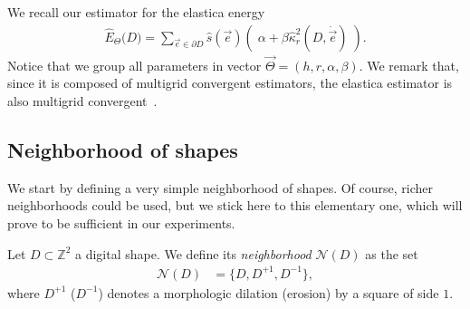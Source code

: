 \documentclass[review]{siamart220329}
\newcommand{\digset}{D} %
\begin{document}
%
%
We recall our estimator for the elastica energy 
%
\begin{align}
    \hat{E}_{\Theta}\big( \digset \big) = \sum_{\vec{e} \in \partial \digset}{
    \hat{s}(\vec{e})\left(\; \alpha + \beta
    \hat{\kappa}_{r}^2(\digset,\dot{\vec{e}}) \; \right)}.
	\label{eq:elastica-estimator-2}
\end{align}
%
%
Notice that we group all parameters in vector $\vec{\Theta}=(h,r,\alpha,\beta)$.
We remark that, since it is composed of multigrid convergent estimators, the
elastica estimator is also multigrid convergent~\cite{lachaud06hdr}.
%

%    
%
%
%
\subsection{Neighborhood of shapes}
%
%
We start by defining a very simple neighborhood of shapes. Of course, richer
neighborhoods could be used, but we stick here to this elementary one, which
will prove to be sufficient in our experiments.
%
%
\begin{definition}
    Let $\digset \subset \mathbb{Z}^2$ a digital shape. We define its {\em
    neighborhood}  $\mathcal{N}(\digset)$ as the set
	\begin{align*}
		\mathcal{N}(\digset) &= \Big\{\digset, \digset^{+1},\digset^{-1} \big\},
	\end{align*}
    where $\digset^{+1}$ ($\digset^{-1}$) denotes a morphologic dilation (erosion) by a
    square of side $1$.
\end{definition}
%
%
\end{document}
